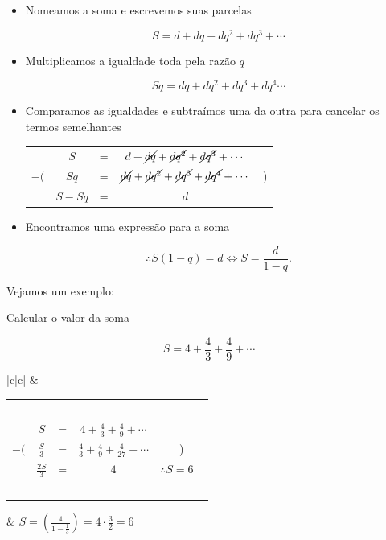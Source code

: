 \begin{itemize}

\item Nomeamos a soma e escrevemos suas parcelas

\[
S=d+dq+dq^2+dq^3+\cdots
\]

\item Multiplicamos a igualdade toda pela razão $q$

\[
Sq=dq+dq^2+dq^3+dq^4\cdots
\]

\item Comparamos as igualdades e subtraímos uma da outra para cancelar os termos semelhantes

\begin{center}
	\begin{tabular}{ccccc}
		\  & $S$ & = & $d+\cancel{dq}+\cancel{dq^2}+\cancel{dq^3}+\cdots$ & \ \\
		$-($ & $Sq$  & = & $\cancel{dq}+\cancel{dq^2}+\cancel{dq^3}+\cancel{dq^4}+\cdots$  & ) \\
		\midrule
		\  & $S-Sq$ & = & $ d $ & \ \\
	\end{tabular}
\end{center}


\item Encontramos uma expressão para a soma

\[
\therefore S(1-q)=d \iff S=\dfrac{d}{1-q}.
\]
\end{itemize}

Vejamos um exemplo:

Calcular o valor da soma

\[
S= 4+\frac43+\frac49+\cdots
\]


\begin{center}
	\begin{tabular}{|c|c|}
		\hline
		 &  \\ \hline
		\begin{tabular}{ccccc}
			&&&& \ \\
			\  & $S$ & = & $4+\frac43+\frac49+\cdots$ & \ \\
			$-($ & $\frac S3$  & = & $\frac43+\frac49+\frac4{27}+\cdots$  & ) \\
			\midrule
			\  & $\frac{2S}3$ & = & $ 4 $ & $\therefore S=6$ \ \\
			&&&& \ \\
		\end{tabular}        &    $S=\left(\frac 4{1-\frac13}\right)=4\cdot \frac32=6$     \\ \hline
	\end{tabular}
\end{center}


